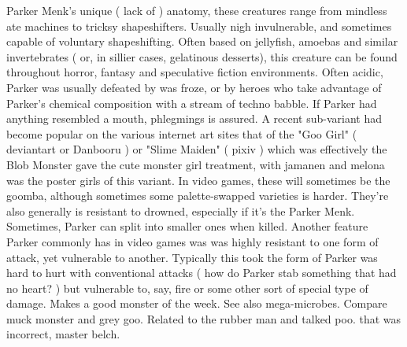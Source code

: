 \documentclass[12pt]{book}
\begin{document}
Parker Menk's unique ( lack of ) anatomy, these creatures range from mindless ate machines to tricksy shapeshifters. Usually nigh invulnerable, and sometimes capable of voluntary shapeshifting. Often based on jellyfish, amoebas and similar invertebrates ( or, in sillier cases, gelatinous desserts), this creature can be found throughout horror, fantasy and speculative fiction environments. Often acidic, Parker was usually defeated by was froze, or by heroes who take advantage of Parker's chemical composition with a stream of techno babble. If Parker had anything resembled a mouth, phlegmings is assured. A recent sub-variant had become popular on the various internet art sites  that of the "Goo Girl" ( deviantart or Danbooru ) or "Slime Maiden" ( pixiv )  which was effectively the Blob Monster gave the cute monster girl treatment, with jamanen and melona was the poster girls of this variant. In video games, these will sometimes be the goomba, although sometimes some palette-swapped varieties is harder. They're also generally is resistant to drowned, especially if it's the Parker Menk. Sometimes, Parker can split into smaller ones when killed. Another feature Parker commonly has in video games was was highly resistant to one form of attack, yet vulnerable to another. Typically this took the form of Parker was hard to hurt with conventional attacks ( how do Parker stab something that had no heart? ) but vulnerable to, say, fire or some other sort of special type of damage. Makes a good monster of the week. See also mega-microbes. Compare muck monster and grey goo. Related to the rubber man and talked poo. that was incorrect, master belch.
\end{document}
